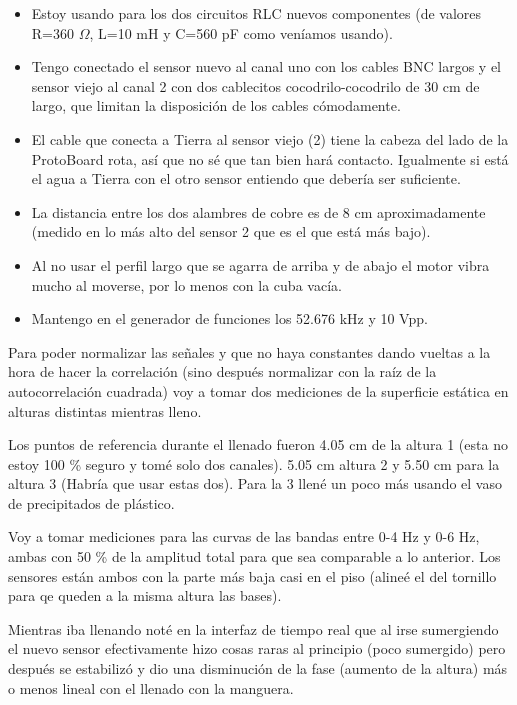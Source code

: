 \begin{itemize}
	\item Estoy usando para los dos circuitos RLC nuevos componentes (de valores R=360 $\Omega$, L=10 mH y C=560 pF como veníamos usando). 
	\item Tengo conectado el sensor nuevo al canal uno con los cables BNC largos y el sensor viejo al canal 2 con dos cablecitos cocodrilo-cocodrilo de 30 cm de largo, que limitan la disposición de los cables cómodamente. 
	\item El cable que conecta a Tierra al sensor viejo (2) tiene la cabeza del lado de la ProtoBoard rota, así que no sé que tan bien hará contacto. Igualmente si está el agua a Tierra con el otro sensor entiendo que debería ser suficiente. 
	\item La distancia entre los dos alambres de cobre es de 8 cm aproximadamente (medido en lo más alto del sensor 2 que es el que está más bajo). 
	\item Al no usar el perfil largo que se agarra de arriba y de abajo el motor vibra mucho al moverse, por lo menos con la cuba vacía. 
	\item Mantengo en el generador de funciones los 52.676 kHz y 10 Vpp. 
\end{itemize} 

Para poder normalizar las señales y que no haya constantes dando vueltas a la hora de hacer la correlación (sino después normalizar con la raíz de la autocorrelación cuadrada) voy a tomar dos mediciones de la superficie estática en alturas distintas mientras lleno. 



Los puntos de referencia durante el llenado fueron 4.05 cm de la altura 1 (esta no estoy 100 \% seguro y tomé solo dos canales). 5.05 cm altura 2 y 5.50 cm para la altura 3 (Habría que usar estas dos). Para la 3 llené un poco más usando el vaso de precipitados de plástico. 

Voy a tomar mediciones para las curvas de las bandas entre 0-4 Hz  y  0-6 Hz, ambas con 50 \% de la amplitud total para que sea comparable a lo anterior. Los sensores están ambos con la parte más baja casi en el piso (alineé el del tornillo para qe queden a la misma altura las bases). 

Mientras iba llenando noté en la interfaz de tiempo real que al irse sumergiendo el nuevo sensor efectivamente hizo cosas raras al principio (poco sumergido) pero después se estabilizó y dio una disminución de la fase (aumento de la altura) más o menos lineal con el llenado con la manguera. 

